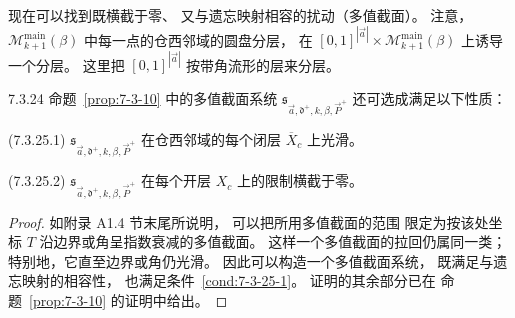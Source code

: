 
现在可以找到既横截于零、
又与遗忘映射相容的扰动（多值截面）。
注意，
$\mathcal M^{\mathrm{main}}_{k+1}(\beta)$
中每一点的仓西邻域的圆盘分层，
在
$[0,1]^{|\vec a|}\times
\mathcal M^{\mathrm{main}}_{k+1}(\beta)$
上诱导一个分层。
这里把 $[0,1]^{|\vec a|}$
按带角流形的层来分层。

\begin{lemma}{7.3.24}\label{lem:7-3-24}
命题~\ref{prop:7-3-10} 中的多值截面系统
$\mathfrak s_{\vec a,\mathfrak d^+,k,\beta,\vec P^+}$
还可选成满足以下性质：

\par\noindent\textup{(7.3.25.1)}\label{cond:7-3-25-1}\quad
$\mathfrak s_{\vec a,\mathfrak d^+,k,\beta,\vec P^+}$
在仓西邻域的每个闭层 $\overline X_c$
上光滑。

\par\noindent\textup{(7.3.25.2)}\label{cond:7-3-25-2}\quad
$\mathfrak s_{\vec a,\mathfrak d^+,k,\beta,\vec P^+}$
在每个开层 $X_c$ 上的限制横截于零。
\end{lemma}

\begin{proof}
如附录 A1.4 节末尾所说明，
可以把所用多值截面的范围
限定为按该处坐标 $T$
沿边界或角呈指数衰减的多值截面。
这样一个多值截面的拉回仍属同一类；
特别地，它直至边界或角仍光滑。
因此可以构造一个多值截面系统，
既满足与遗忘映射的相容性，
也满足条件~\ref{cond:7-3-25-1}。
证明的其余部分已在
命题~\ref{prop:7-3-10} 的证明中给出。
\end{proof}
